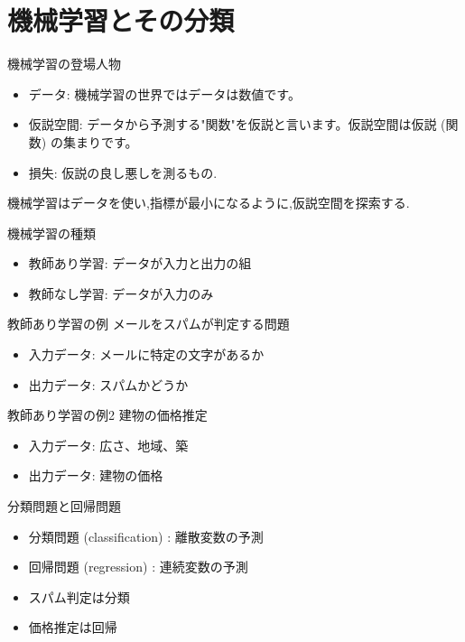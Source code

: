 \section{機械学習とその分類}


\begin{frame}機械学習の登場人物
\begin{itemize}
\item データ: 機械学習の世界ではデータは数値です。
\item 仮説空間: データから予測する"関数"を仮説と言います。仮説空間は仮説 (関数) の集まりです。
\item 損失: 仮説の良し悪しを測るもの.
\end{itemize}
機械学習はデータを使い,指標が最小になるように,仮説空間を探索する.
\end{frame}


\begin{frame}{機械学習の種類}
\begin{itemize}
\item 教師あり学習: データが入力と出力の組
\item 教師なし学習: データが入力のみ
\end{itemize}
\end{frame}


\begin{frame}{教師あり学習の例}
メールをスパムが判定する問題
\begin{itemize}
\item 入力データ: メールに特定の文字があるか
\item 出力データ: スパムかどうか
\end{itemize}
\end{frame}


\begin{frame}{教師あり学習の例2}
建物の価格推定
\begin{itemize}
\item 入力データ: 広さ、地域、築
\item 出力データ: 建物の価格
\end{itemize}
\end{frame}


\begin{frame}{分類問題と回帰問題}
\begin{itemize}
\item 分類問題 (classification) : 離散変数の予測
\item 回帰問題 (regression) : 連続変数の予測
\item スパム判定は分類
\item 価格推定は回帰
\end{itemize}
\end{frame}


